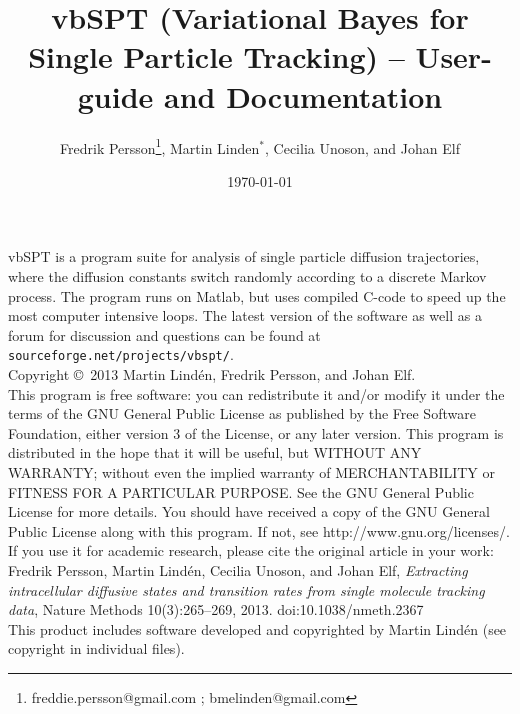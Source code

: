 \documentclass[11pt,a4paper]{article}
\title{vbSPT (Variational Bayes for Single Particle Tracking) -- User-guide and Documentation}
\author{Fredrik Persson\footnote{freddie.persson@gmail.com ; bmelinden@gmail.com},
Martin Linden$^*$, Cecilia Unoson, and Johan Elf}
\date{\today}
\begin{document}
\maketitle 

\noindent vbSPT is a program suite for analysis of single particle diffusion
trajectories, where the diffusion constants switch randomly according
to a discrete Markov process. The program runs on Matlab, but uses
compiled C-code to speed up the most computer intensive loops.  The
latest version of the software as well as a forum for discussion and
questions can be found at \verb+sourceforge.net/projects/vbspt/+.\medskip\\

\noindent Copyright \copyright \  2013 Martin Lind\'en, Fredrik Persson, and
Johan Elf.\medskip\\
 
\noindent This program is free software: you can redistribute it
and/or modify it under the terms of the GNU General Public License as
published by the Free Software Foundation, either version 3 of the
License, or any later version.  This program is distributed in the
hope that it will be useful, but WITHOUT ANY WARRANTY; without even
the implied warranty of MERCHANTABILITY or FITNESS FOR A PARTICULAR
PURPOSE. See the GNU General Public License for more details. You
should have received a copy of the GNU General Public License along
with this program. If not, see http://www.gnu.org/licenses/.\medskip\\

\noindent If you use it for academic research, please cite the
original article in your work:\medskip\\
\noindent Fredrik Persson, Martin Lind\'en, Cecilia Unoson, and Johan
Elf, \emph{Extracting intracellular diffusive states and transition
  rates from single molecule tracking data}, Nature Methods 10(3):265–269,
2013. doi:10.1038/nmeth.2367 \medskip\\


\noindent  This product includes software developed and copyrighted by Martin
Lind\'en (see copyright in individual files). 
\end{document}
